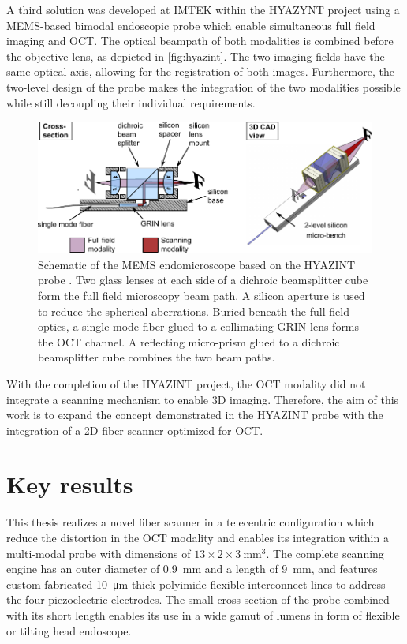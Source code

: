 A third solution was developed at IMTEK within the HYAZYNT project \cite{Blattmann} \cite{Kretschmer} using a MEMS-based bimodal endoscopic probe which enable simultaneous full field imaging and OCT. The optical beampath of both modalities is combined before the objective lens, as depicted in \autoref{fig:hyazint}. The two imaging fields have the same optical axis, allowing for the registration of both images. Furthermore, the two-level design of the probe makes the integration of the two modalities possible while still decoupling their individual requirements. 
\begin{figure}[h!]\centering
      \includegraphics{figures/10_Introduction/hyazint.pdf}
      \caption{Schematic of the MEMS endomicroscope based on the HYAZINT probe \cite{Blattmann}. Two glass lenses at each side of a dichroic beamsplitter cube form the full field microscopy beam path. A silicon aperture is used to reduce the spherical aberrations. Buried beneath the full field optics, a single mode fiber glued to a collimating GRIN lens forms the OCT channel. A reflecting micro-prism glued to a dichroic beamsplitter cube combines the two beam paths.}
      \label{fig:hyazint}
\end{figure}
With the completion of the HYAZINT project, the OCT modality did not integrate a scanning mechanism to enable 3D imaging. Therefore, the aim of this work is to expand the concept demonstrated in the HYAZINT probe with the integration of a 2D fiber scanner optimized for OCT.


\section{Key results}
This thesis realizes a novel fiber scanner in a telecentric configuration which reduce the distortion in the OCT modality and enables its integration within a multi-modal probe with dimensions of $13 \times 2 \times \SI{3}{\milli\meter^3}$. The complete scanning engine has an outer diameter of \SI{0.9}{\milli\meter} and a length of \SI{9}{\milli\meter}, and features custom fabricated \SI{10}{\micro\meter} thick polyimide flexible interconnect lines to address the four piezoelectric electrodes. The small cross section of the probe combined with its short length enables its use in a wide gamut of lumens in form of flexible or tilting head endoscope.

